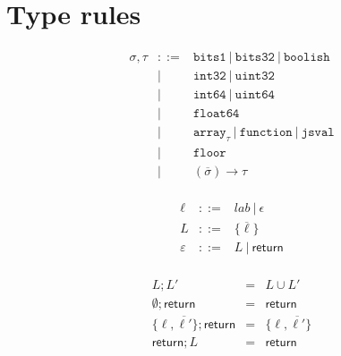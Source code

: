 \documentclass{article}
\newcommand{\funty}[2]{({#1}) \rightarrow {#2}}
\newcommand{\seq}[1]{\overline{{#1}}}
\newcommand{\boolean}{\mathtt{bits1}}
\newcommand{\uintone}{\mathtt{uint8}}
\newcommand{\uinttwo}{\mathtt{uint16}}
\newcommand{\uintfour}{\mathtt{uint32}}
\newcommand{\uinteight}{\mathtt{uint64}}
\newcommand{\intone}{\mathtt{int8}}
\newcommand{\inttwo}{\mathtt{int16}}
\newcommand{\intfour}{\mathtt{int32}}
\newcommand{\inteight}{\mathtt{int64}}
\newcommand{\float}{\mathtt{float32}}
\newcommand{\double}{\mathtt{float64}}
\newcommand{\arr}[1]{\mathtt{array}_{#1}}
\newcommand{\any}{\mathtt{jsval}}
\newcommand{\str}{\mathtt{string}}
\newcommand{\undef}{\mathtt{undefined}}
\newcommand{\nul}{\mathtt{null}}
\newcommand{\num}{\mathtt{number}}
\newcommand{\obj}{\mathtt{object}}
\newcommand{\mustret}{\mathsf{return}}
\newcommand{\seqcomp}{\mathrel{;}}
\newcommand{\word}{\mathtt{bits32}}
\newcommand{\function}{\mathtt{function}}
\newcommand{\union}[2]{{#1}\mathrel{|}{#2}}
\newcommand{\boolish}{\mathtt{boolish}}
\newcommand{\floor}{\mathtt{floor}}
\begin{document}
\section{Type rules}

\[
\begin{array}{rcl}
\sigma, \tau & ::= & \boolean ~|~ \word ~|~ \boolish \\
             &  |  & \intfour ~|~ \uintfour \\
             &  |  & \inteight ~|~ \uinteight \\
             &  |  & \double \\
             &  |  & \arr{\tau} ~|~ \function ~|~ \any \\
             &  |  & \floor \\
             &  |  & \funty{\seq{\sigma}}{\tau} \\
\end{array}
\]

\[
\begin{array}{rcl}
\ell        & ::= & \mathit{lab} ~|~ \epsilon \\
L           & ::= & \{ \seq{\ell} \} \\
\varepsilon & ::= & L ~|~ \mustret \\
\end{array}
\]

\[
\begin{array}{rcl}
L                       \seqcomp L'       & = & L \cup L' \\
\emptyset               \seqcomp \mustret & = & \mustret \\
\{ \ell, \seq{\ell'} \} \seqcomp \mustret & = & \{ \ell, \seq{\ell'} \} \\
\mustret                \seqcomp L        & = & \mustret \\
\end{array}
\]
\end{document}
